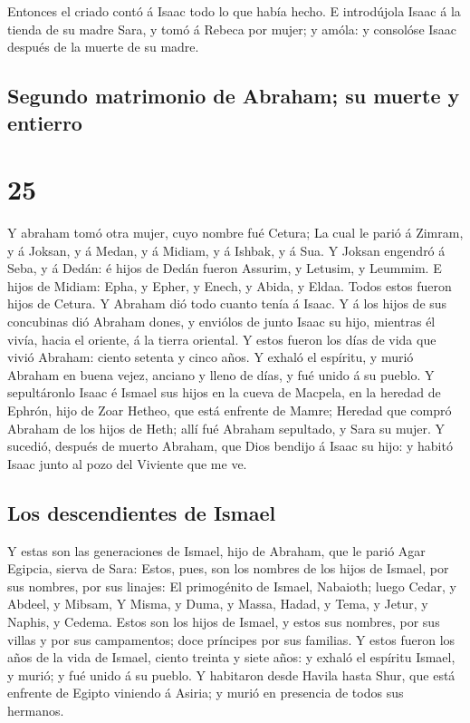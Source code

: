  Entonces el criado contó á Isaac todo lo que había hecho.
 E introdújola Isaac á la tienda de su madre Sara, y tomó á
Rebeca por mujer; y amóla: y consolóse Isaac después de la muerte de su
madre.

\hypertarget{segundo-matrimonio-de-abraham-su-muerte-y-entierro}{%
\subsection{Segundo matrimonio de Abraham; su muerte y
entierro}\label{segundo-matrimonio-de-abraham-su-muerte-y-entierro}}

\hypertarget{section-24}{%
\section{25}\label{section-24}}

 Y abraham tomó otra mujer, cuyo nombre fué Cetura;
 La cual le parió á Zimram, y á Joksan, y á Medan, y á
Midiam, y á Ishbak, y á Sua.  Y Joksan engendró á Seba, y á
Dedán: é hijos de Dedán fueron Assurim, y Letusim, y Leummim.
 E hijos de Midiam: Epha, y Epher, y Enech, y Abida, y
Eldaa. Todos estos fueron hijos de Cetura.  Y Abraham dió
todo cuanto tenía á Isaac.  Y á los hijos de sus concubinas
dió Abraham dones, y enviólos de junto Isaac su hijo, mientras él vivía,
hacia el oriente, á la tierra oriental.  Y estos fueron los
días de vida que vivió Abraham: ciento setenta y cinco años.
 Y exhaló el espíritu, y murió Abraham en buena vejez,
anciano y lleno de días, y fué unido á su pueblo.  Y
sepultáronlo Isaac é Ismael sus hijos en la cueva de Macpela, en la
heredad de Ephrón, hijo de Zoar Hetheo, que está enfrente de Mamre;
 Heredad que compró Abraham de los hijos de Heth; allí fué
Abraham sepultado, y Sara su mujer.  Y sucedió, después de
muerto Abraham, que Dios bendijo á Isaac su hijo: y habitó Isaac junto
al pozo del Viviente que me ve.

\hypertarget{los-descendientes-de-ismael}{%
\subsection{Los descendientes de
Ismael}\label{los-descendientes-de-ismael}}

 Y estas son las generaciones de Ismael, hijo de Abraham,
que le parió Agar Egipcia, sierva de Sara:  Estos, pues,
son los nombres de los hijos de Ismael, por sus nombres, por sus
linajes: El primogénito de Ismael, Nabaioth; luego Cedar, y Abdeel, y
Mibsam,  Y Misma, y Duma, y Massa,  Hadad, y
Tema, y Jetur, y Naphis, y Cedema.  Estos son los hijos de
Ismael, y estos sus nombres, por sus villas y por sus campamentos; doce
príncipes por sus familias.  Y estos fueron los años de la
vida de Ismael, ciento treinta y siete años: y exhaló el espíritu
Ismael, y murió; y fué unido á su pueblo.  Y habitaron
desde Havila hasta Shur, que está enfrente de Egipto viniendo á Asiria;
y murió en presencia de todos sus hermanos.

